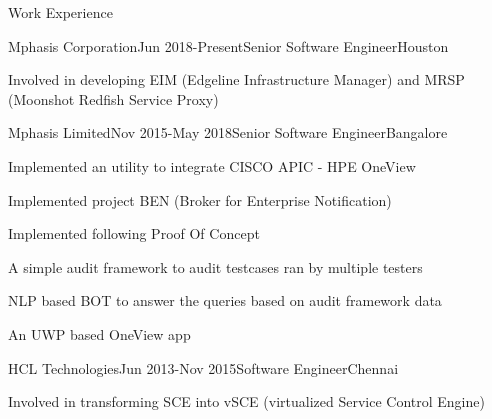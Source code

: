 \documentclass{resume} %
\begin{document}
\begin{rSection}{ Work Experience } \itemsep -1pt        

\begin{rSubsection}{Mphasis Corporation}{Jun 2018-Present}{Senior Software Engineer}{Houston}    

\vspace{-3pt}

\item Involved in developing EIM (Edgeline Infrastructure Manager) and MRSP (Moonshot Redfish Service Proxy)
\end{rSubsection} 

\vspace{-4pt}


\begin{rSubsection}{Mphasis Limited}{Nov 2015-May 2018}{Senior Software Engineer}{Bangalore}    

\vspace{-3pt}

\item Implemented an utility to integrate CISCO APIC - HPE OneView 
\item Implemented project BEN (Broker for Enterprise Notification)
\item Implemented following Proof Of Concept
\begin{list}{}{}
\vspace{-5pt}
\item A simple audit framework to audit testcases ran by multiple testers
\vspace{-5pt}
\item NLP based BOT to answer the queries based on audit framework data
\vspace{-5pt}
\item An UWP based OneView app
\end{list}
\end{rSubsection} 

\vspace{-4pt}


\begin{rSubsection}{HCL Technologies}{Jun 2013-Nov 2015}{Software Engineer}{Chennai}    

\vspace{-3pt}

\item Involved in transforming SCE into vSCE (virtualized Service Control Engine)


\end{rSubsection}
\end{rSection}
\end{document}
